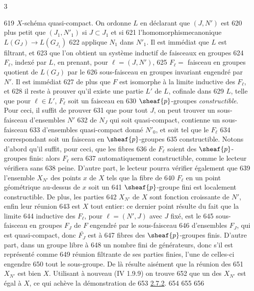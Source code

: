 3	\documentclass[10pt]{../fichiers-configuration-latex/smfart}
\begin{document}
   619	$X$-schéma quasi-compact. On ordonne $L$ en déclarant que $(J,N')$ est
   620	plus petit que $(J_1, N'_1)$ si $J\subset J_1$ et si
   621	l'homomorphisme\pageoriginale canonique $L(G_J)\rightarrow L(G_{J_1})$
   622	applique $N_1$ dans $N'_1$. Il est immédiat que $L$ est filtrant, et
   623	que l'on obtient un système inductif de faisceaux en groupes
   624	$F_{\ell}$, indexé par $L$, en prenant, pour $\ell=(J,N')$,
   625	$F_{\ell}=$ faisceau en groupes quotient de $L(G_J)$ par le
   626	sous-faisceau en groupes invariant engendré par $N'$. Il est immédiat
   627	de plus que $F$ est isomorphe à la limite inductive des $F_{\ell}$, et
   628	il reste à prouver qu'il existe une partie $L'$ de $L$, cofinale dans
   629	$L$, telle que pour $\ell\in L'$, $F_{\ell}$ soit un faisceau en
   630	$\sheaf{p}$-groupes \emph{constructible}. Pour ceci, il suffit de prouver
   631	que pour tout $J$, on peut trouver un sous-faisceau d'ensembles $N'$
   632	de $N_J$ qui soit quasi-compact, contienne un sous-faisceau
   633	d'ensembles quasi-compact donné $N'_0$, et soit tel que le $F_{\ell}$
   634	correspondant soit un faisceau en $\sheaf{p}$-groupes
   635	constructible. Notons d'abord qu'il suffit, pour ceci, que les fibres
   636	de $F_{\ell}$ soient des $\sheaf{p}$-groupes finis: alors $F_{\ell}$ sera
   637	automatiquement constructible, comme le lecteur vérifiera sans
   638	peine. D'autre part, le lecteur pourra vérifier également que
   639	l'ensemble $X_{N'}$ des points $x$ de $X$ tels que la fibre de
   640	$F_{\ell}$ en un point géométrique au-dessus de $x$ soit un
   641	$\sheaf{p}$-groupe fini est localement constructible. De plus, les parties
   642	$X_{N'}$ de $X$ sont fonction croissante de $N'$, enfin leur réunion
   643	est $X$ tout entier: ce dernier point résulte du fait que la limite
   644	inductive des $F_{\ell}$, pour $\ell=(N',J)$ avec $J$ fixé, est le
   645	sous-faisceau en groupes $F_J$ de $F$ engendré par le sous-faisceau
   646	d'ensembles $F_J$, qui est quasi-compact, donc $\bar{F_J}$ est à
   647	fibres des $\sheaf{p}$-groupes finis. D'autre part, dans un groupe libre à
   648	un nombre fini de générateurs, donc s'il est représenté comme
   649	réunion filtrante de ses parties finies, l'une de celles-ci engendre
   650	tout le sous-groupe. De là résulte aisément que la réunion des
   651	$X_{N'}$ est bien $X$. Utilisant à nouveau (\EGA IV 1.9.9) on trouve
   652	que un des $X_{N'}$ est égal à $X$, ce qui achève la démonstration de
   653	\hyperref[IX.cor2.7.2]{2.7.2}.
   654	
   655	\setcounter{subsection}{7}
   656	\setcounter{subsubsection}{2}
\end{document}
